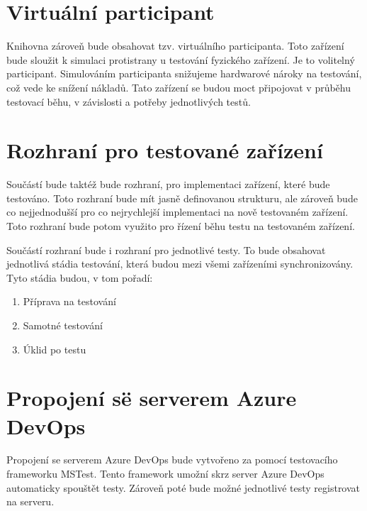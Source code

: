 \section{Virtuální participant}
Knihovna zároveň bude obsahovat tzv. virtuálního participanta. Toto zařízení bude sloužit k simulaci protistrany u testování fyzického zařízení. Je to volitelný participant. Simulováním participanta snižujeme hardwarové nároky na testování, což vede ke snížení nákladů. Tato zařízení se budou moct připojovat v průběhu testovací běhu, v závislosti a potřeby jednotlivých testů.


\section{Rozhraní pro testované zařízení}
Součástí bude taktéž bude rozhraní, pro implementaci zařízení, které bude testováno. Toto rozhraní bude mít jasně definovanou  strukturu, ale zároveň bude co nejjednodušší pro co nejrychlejší implementaci na nově testovaném zařízení. Toto rozhraní bude potom využito pro řízení běhu testu na testovaném zařízení.

Součástí rozhraní bude i rozhraní pro jednotlivé testy. To bude obsahovat jednotlivá stádia testování, která budou mezi všemi zařízeními synchronizovány. Tyto stádia budou, v tom pořadí:
\begin{enumerate}
    \item Příprava na testování
    \item Samotné testování
    \item Úklid po testu
\end{enumerate}


\section{Propojení së serverem Azure DevOps}
Propojení se serverem Azure DevOps bude vytvořeno za pomocí testovacího frameworku MSTest. Tento framework umožní skrz server Azure DevOps automaticky spouštět testy. Zároveň poté bude možné jednotlivé testy registrovat na serveru. 


